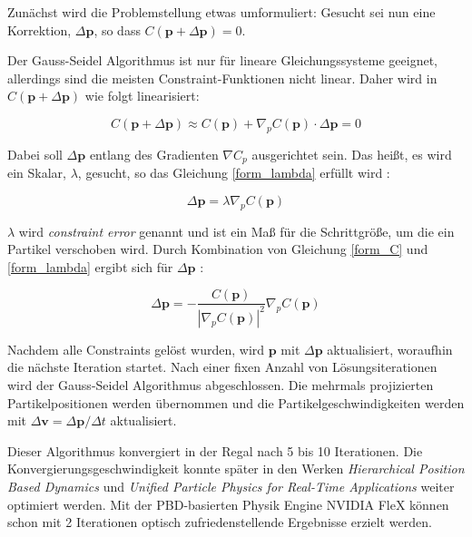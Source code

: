 Zunächst wird die Problemstellung etwas umformuliert: Gesucht sei nun eine Korrektion, $\Delta \textbf{p}$, so dass $C(\textbf{p}+\Delta \textbf{p})=0$. 

Der Gauss-Seidel Algorithmus ist nur für lineare Gleichungssysteme geeignet, allerdings sind die meisten Constraint-Funktionen nicht linear. Daher wird in \cite{PBD} $C(\textbf{p}+\Delta \textbf{p})$ wie folgt linearisiert:

\begin{equation}
C(\textbf{p}+\Delta \textbf{p}) \approx C(\textbf{p}) + \nabla_p C(\textbf{p}) \cdot \Delta \textbf{p} = 0
\label{form_C}
\end{equation}

Dabei soll $\Delta \textbf{p}$ entlang des Gradienten $\nabla C_p$ ausgerichtet sein. Das heißt, es wird ein Skalar, $\lambda$, gesucht, so das Gleichung \ref{form_lambda} erfüllt wird \cite{PBD}:

\begin{equation}
\Delta \textbf{p} = \lambda \nabla_p C(\textbf{p})
\label{form_lambda}
\end{equation}

$\lambda$ wird \textit{constraint error} genannt und ist ein Maß für die Schrittgröße, um die ein Partikel verschoben wird. Durch Kombination von Gleichung \ref{form_C} und \ref{form_lambda} ergibt sich für $\Delta \textbf{p}$ \cite{PBD}:

\begin{equation}
\Delta \textbf{p} = - \frac{C(\textbf{p})}{|\nabla_p C(\textbf{p})|^2} \nabla_p C(\textbf{p}) 
\label{form_db}
\end{equation}

Nachdem alle Constraints gelöst wurden, wird $\textbf{p}$ mit $\Delta \textbf{p}$ aktualisiert, woraufhin die nächste Iteration startet. Nach einer fixen Anzahl von Lösungsiterationen wird der Gauss-Seidel Algorithmus abgeschlossen. Die mehrmals projizierten Partikelpositionen werden übernommen und die Partikelgeschwindigkeiten werden mit $\Delta \textbf{v} = \Delta \textbf{p} / \Delta t$ aktualisiert.

Dieser Algorithmus konvergiert in der Regal nach 5 bis 10 Iterationen. Die Konvergierungsgeschwindigkeit konnte später in den Werken \textit{Hierarchical Position Based Dynamics} \cite{Mller2008HierarchicalPB} und \textit{Unified Particle Physics for Real-Time Applications} \cite{UPP} weiter optimiert werden. Mit der PBD-basierten Physik Engine NVIDIA FleX können schon mit 2 Iterationen optisch zufriedenstellende Ergebnisse erzielt werden.

